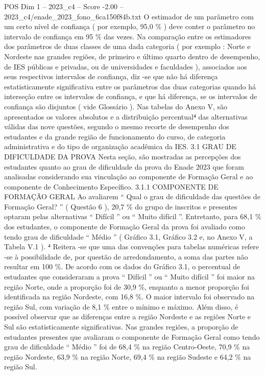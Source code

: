 \begin{textsample}{POS Dim 1 – 2023\_c4 – Score -2.00 – 2023\_c4/enade\_2023\_fono\_6ca150f84b.txt}
O estimador de um parâmetro com um certo nível de confiança ( por exemplo, 95,0 \% ) deve conter o parâmetro no intervalo de confiança em 95 \% das vezes.
Na comparação entre os estimadores dos parâmetros de duas classes de uma dada categoria ( por exemplo : Norte e Nordeste nas grandes regiões, de primeiro e último quarto dentro de desempenho, de IES públicas e privadas, ou de universidades e faculdades ), associados aos seus respectivos intervalos de confiança, diz -se que não há diferença estatisticamente significativa entre os parâmetros das duas categorias quando há interseção entre os intervalos de confiança, e que há diferença, se os intervalos de confiança são disjuntos ( vide Glossário ).
Nas tabelas do Anexo V, são apresentados os valores absolutos e a distribuição percentual⁴ das alternativas válidas das nove questões, segundo o mesmo recorte de desempenho dos estudantes e da grande região de funcionamento do curso, de categoria administrativa e do tipo de organização acadêmica da IES. 3.1 GRAU DE DIFICULDADE DA PROVA Nesta seção, são mostradas as percepções dos estudantes quanto ao grau de dificuldade da prova do Enade 2023 que foram analisadas considerando sua vinculação ao componente de Formação Geral e ao componente de Conhecimento Específico. 3.1.1 COMPONENTE DE FORMAÇÃO GERAL Ao avaliarem “ Qual o grau de dificuldade das questões de Formação Geral? ” ( Questão 6 ), 20,7 \% do grupo de inscritos e presentes optaram pelas alternativas “ Difícil ” ou “ Muito difícil ”.
Entretanto, para 68,1 \% dos estudantes, o componente de Formação Geral da prova foi avaliado como tendo grau de dificuldade “ Médio ” ( Gráfico 3.1, Gráfico 3.2 e, no Anexo V, a Tabela V.1 ). ⁴ Reitera -se que uma das convenções para tabelas numéricas refere -se à possibilidade de, por questão de arredondamento, a soma das partes não resultar em 100 \%.
De acordo com os dados do Gráfico 3.1, o percentual de estudantes que consideraram a prova “ Difícil ” ou “ Muito difícil ” foi maior na região Norte, onde a proporção foi de 30,9 \%, enquanto a menor proporção foi identificada na região Nordeste, com 16,8 \%.
O maior intervalo foi observado na região Sul, com variação de 8,1 \% entre o mínimo e máximo.
Além disso, é possível observar que as diferenças entre a região Nordeste e as regiões Norte e Sul são estatisticamente significativas.
Nas grandes regiões, a proporção de estudantes presentes que avaliaram o componente de Formação Geral como tendo grau de dificuldade “ Médio ” foi de 68,4 \% na região Centro-Oeste, 70,9 \% na região Nordeste, 63,9 \% na região Norte, 69,4 \% na região Sudeste e 64,2 \% na região Sul.

\end{textsample}
